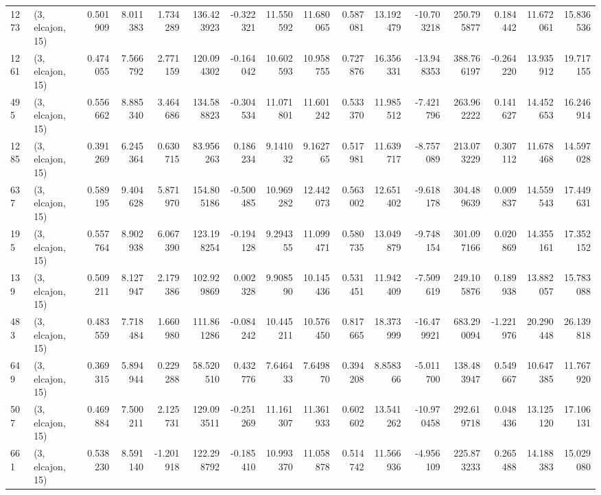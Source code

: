 \begin{tabular}{llrrrrrrrrrrrrrr}
1273 &  (3, elcajon, 15) &   0.501909 &   8.011383 &   1.734289 &    136.423923 &   -0.322321 &   11.550592 &   11.680065 &  0.587081 &  13.192479 & -10.703218 &   250.795877 &   0.184442 &  11.672061 &  15.836536 \\
1261 &  (3, elcajon, 15) &   0.474055 &   7.566792 &   2.771159 &    120.094302 &   -0.164042 &   10.602593 &   10.958755 &  0.727876 &  16.356331 & -13.948353 &   388.766197 &  -0.264220 &  13.935912 &  19.717155 \\
495  &  (3, elcajon, 15) &   0.556662 &   8.885340 &   3.464686 &    134.588823 &   -0.304534 &   11.071801 &   11.601242 &  0.533370 &  11.985512 &  -7.421796 &   263.962222 &   0.141627 &  14.452653 &  16.246914 \\
1285 &  (3, elcajon, 15) &   0.391269 &   6.245364 &   0.630715 &     83.956263 &    0.186234 &    9.141032 &    9.162765 &  0.517981 &  11.639717 &  -8.757089 &   213.073229 &   0.307112 &  11.678468 &  14.597028 \\
637  &  (3, elcajon, 15) &   0.589195 &   9.404628 &   5.871970 &    154.805186 &   -0.500485 &   10.969282 &   12.442073 &  0.563002 &  12.651402 &  -9.618178 &   304.489639 &   0.009837 &  14.559543 &  17.449631 \\
195  &  (3, elcajon, 15) &   0.557764 &   8.902938 &   6.067390 &    123.198254 &   -0.194128 &    9.294355 &   11.099471 &  0.580735 &  13.049879 &  -9.748154 &   301.097166 &   0.020869 &  14.355161 &  17.352152 \\
139  &  (3, elcajon, 15) &   0.509211 &   8.127947 &   2.179386 &    102.929869 &    0.002328 &    9.908590 &   10.145436 &  0.531451 &  11.942409 &  -7.509619 &   249.105876 &   0.189938 &  13.882057 &  15.783088 \\
483  &  (3, elcajon, 15) &   0.483559 &   7.718484 &   1.660980 &    111.861286 &   -0.084242 &   10.445211 &   10.576450 &  0.817665 &  18.373999 & -16.479921 &   683.290094 &  -1.221976 &  20.290448 &  26.139818 \\
649  &  (3, elcajon, 15) &   0.369315 &   5.894944 &   0.229288 &     58.520510 &    0.432776 &    7.646433 &    7.649870 &  0.394208 &   8.858366 &  -5.011700 &   138.483947 &   0.549667 &  10.647385 &  11.767920 \\
507  &  (3, elcajon, 15) &   0.469884 &   7.500211 &   2.125731 &    129.093511 &   -0.251269 &   11.161307 &   11.361933 &  0.602602 &  13.541262 & -10.970458 &   292.619718 &   0.048436 &  13.125120 &  17.106131 \\
661  &  (3, elcajon, 15) &   0.538230 &   8.591140 &  -1.201918 &    122.298792 &   -0.185410 &   10.993370 &   11.058878 &  0.514742 &  11.566936 &  -4.956109 &   225.873233 &   0.265488 &  14.188383 &  15.029080 \\

\end{tabular}
